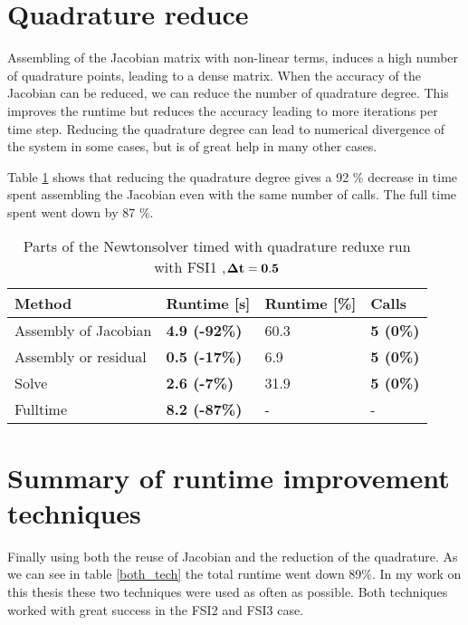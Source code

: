 \section{Quadrature reduce}
Assembling of the Jacobian matrix with non-linear terms, induces a high number of quadrature points, leading to a dense matrix. When the accuracy of the Jacobian can be reduced, we can reduce the number of quadrature degree. This improves the runtime but reduces the accuracy leading to more iterations per time step. Reducing the quadrature degree can lead to numerical divergence of the system in some cases, but is of great help in many other cases.\newline

Table \ref{tab:quadreduce} shows that reducing the quadrature degree gives a 92 \% decrease in time spent assembling the Jacobian even with the same number of calls. The full time spent went down by 87 \%.
\begin{table}[H]
\centering
\caption{Parts of the Newtonsolver timed with quadrature reduxe run with FSI1 ,$\bold{\Delta t = 0.5}$}
\label{tab:quadreduce}
\begin{tabular}{|l|l|l|l|}
\hline
Method & \textbf{Runtime {[}s{]}} & Runtime {[}\%{]} & \textbf{Calls} \\ \hline
Assembly of Jacobian & \textbf{4.9 (-92\%)} & 60.3 & \textbf{5 (0\%)} \\ \hline
Assembly or residual & \textbf{0.5 (-17\%)} & 6.9 & \textbf{5 (0\%)} \\ \hline
Solve & \textbf{2.6 (-7\%)} & 31.9 & \textbf{5 (0\%)} \\ \hline
Fulltime & \textbf{8.2 (-87\%)} & - & - \\ \hline
\end{tabular}
\end{table}


\section{Summary of runtime improvement techniques}
Finally using both the reuse of Jacobian and the reduction of the quadrature. As we can see in table \ref{both_tech} the total runtime went down 89\%. In my work on this thesis these two techniques were used as often as possible. Both techniques worked with great success in the FSI2 and FSI3 case.

